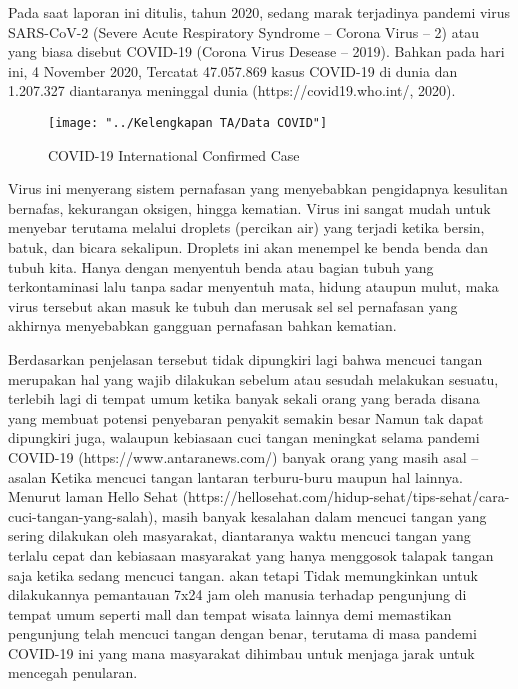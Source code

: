 \documentclass[a4paper]{article}
\begin{document}
\hspace{7mm}Pada saat laporan ini ditulis, tahun 2020, sedang marak terjadinya pandemi virus SARS-CoV-2 (Severe Acute Respiratory Syndrome – Corona Virus – 2) atau yang biasa disebut COVID-19 (Corona Virus Desease – 2019).  Bahkan pada hari ini, 4 November 2020, Tercatat 47.057.869 kasus COVID-19 di dunia dan 1.207.327 diantaranya meninggal dunia (https://covid19.who.int/, 2020).

\begin{figure}[h]
	\centering
	\texttt{[image: "../Kelengkapan TA/Data COVID"]}
	\caption{COVID-19 International Confirmed Case }
	\label{fig:data-covid}
\end{figure}

\hspace{7mm}Virus ini menyerang sistem pernafasan yang menyebabkan pengidapnya kesulitan bernafas, kekurangan oksigen, hingga kematian. Virus ini sangat mudah untuk menyebar terutama melalui droplets (percikan air) yang terjadi ketika bersin, batuk, dan bicara sekalipun. Droplets ini akan menempel ke benda benda dan tubuh kita. Hanya dengan menyentuh benda atau bagian tubuh yang terkontaminasi lalu tanpa sadar menyentuh mata, hidung ataupun mulut, maka virus tersebut akan masuk ke tubuh dan merusak sel sel pernafasan yang akhirnya menyebabkan gangguan pernafasan bahkan kematian. 

\hspace{7mm}Berdasarkan penjelasan tersebut tidak dipungkiri lagi bahwa mencuci tangan merupakan hal yang wajib dilakukan sebelum atau sesudah melakukan sesuatu, terlebih lagi di tempat umum ketika banyak sekali orang yang berada disana yang membuat potensi penyebaran penyakit semakin besar Namun tak dapat dipungkiri juga, walaupun kebiasaan cuci tangan meningkat selama pandemi COVID-19 (https://www.antaranews.com/) banyak orang yang masih asal – asalan Ketika mencuci tangan lantaran terburu-buru maupun hal lainnya. Menurut laman Hello Sehat (https://hellosehat.com/hidup-sehat/tips-sehat/cara-cuci-tangan-yang-salah), masih banyak kesalahan dalam mencuci tangan yang sering dilakukan oleh masyarakat, diantaranya waktu mencuci tangan yang terlalu cepat dan kebiasaan masyarakat yang hanya menggosok talapak tangan saja ketika sedang mencuci tangan. akan tetapi Tidak memungkinkan untuk dilakukannya pemantauan 7x24 jam oleh manusia terhadap pengunjung di tempat umum seperti mall dan tempat wisata lainnya demi memastikan pengunjung telah mencuci tangan dengan benar, terutama di masa pandemi COVID-19 ini yang mana masyarakat dihimbau untuk menjaga jarak untuk mencegah penularan.
\end{document}
